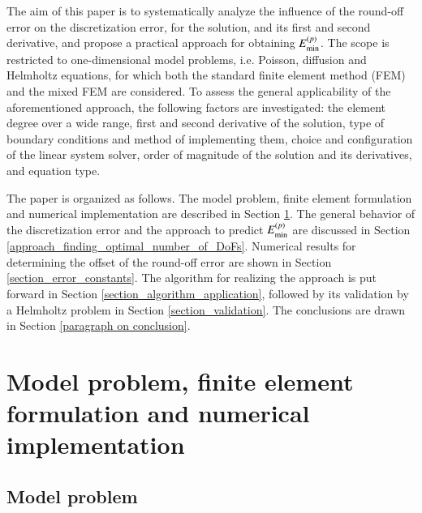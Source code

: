 \documentclass[review,3p]{elsarticle}
\begin{document}
The aim of this paper is to systematically analyze the influence of the round-off error on the discretization error, for the solution, and its first and second derivative, and propose a practical approach for obtaining ${E}_{\rm {min}}^{(p)}$.
The scope is restricted to one-dimensional model problems, i.e. Poisson, diffusion and Helmholtz equations, for which both the standard finite element method (FEM) and the mixed FEM\cite{boffi2013mixed} are considered.
To assess the general applicability of the aforementioned approach, the following factors are investigated: the element degree over a wide range, first and second derivative of the solution, type of boundary conditions and method of implementing them, choice and configuration of the linear system solver, order of magnitude of the solution and its derivatives, and equation type.

The paper is organized as follows. The model problem, finite element formulation and numerical implementation are described in Section \ref{section_model_problem_FEM_formulation_numerical_implementation}. The general behavior of the discretization error and the approach to predict ${E}_{\rm {min}}^{(p)}$ are discussed in Section \ref{approach_finding_optimal_number_of_DoFs}. Numerical results for determining the offset of the round-off error are shown in Section \ref{section_error_constants}. The algorithm for realizing the approach is put forward in Section \ref{section_algorithm_application}, followed by its validation by a Helmholtz problem in Section \ref{section_validation}. The conclusions are drawn in Section \ref{paragraph on conclusion}.

\section{Model problem, finite element formulation and numerical implementation}	\label{section_model_problem_FEM_formulation_numerical_implementation}

\subsection{Model problem}
\end{document}
